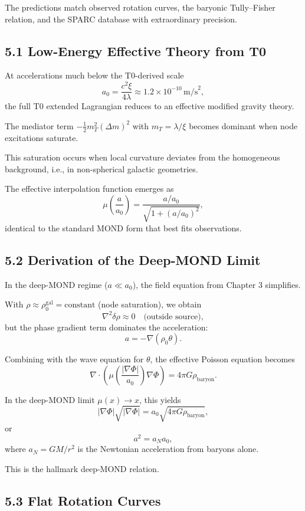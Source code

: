 	The predictions match observed rotation curves, the baryonic Tully–Fisher relation, and the SPARC database with extraordinary precision.
	
	\subsection{5.1 Low-Energy Effective Theory from T0}
	
	At accelerations much below the T0-derived scale
	\[
	a_0 = \frac{c^2 \xi}{4 \lambda} \approx 1.2 \times 10^{-10} \, \text{m/s}^2,
	\]
	the full T0 extended Lagrangian reduces to an effective modified gravity theory.
	
	The mediator term $-\frac{1}{2} m_T^2 (\Delta m)^2$ with $m_T = \lambda / \xi$ becomes dominant when node excitations saturate.
	
	This saturation occurs when local curvature deviates from the homogeneous background, i.e., in non-spherical galactic geometries.
	
	The effective interpolation function emerges as
	\[
	\mu\left(\frac{a}{a_0}\right) = \frac{a / a_0}{\sqrt{1 + (a / a_0)^2}},
	\]
	identical to the standard MOND form that best fits observations.
	
	\subsection{5.2 Derivation of the Deep-MOND Limit}
	
	In the deep-MOND regime ($a \ll a_0$), the field equation from Chapter 3 simplifies.
	
	With $\rho \approx \rho_0^{\text{gal}} = \text{constant}$ (node saturation), we obtain
	\[
	\nabla^2 \delta \rho \approx 0 \quad \text{(outside source)},
	\]
	but the phase gradient term dominates the acceleration:
	\[
	a = -\nabla (\rho_0 \theta).
	\]
	
	Combining with the wave equation for $\theta$, the effective Poisson equation becomes
	\[
	\nabla \cdot \left( \mu\left(\frac{|\nabla \Phi|}{a_0}\right) \nabla \Phi \right) = 4\pi G \rho_{\text{baryon}}.
	\]
	
	In the deep-MOND limit $\mu(x) \to x$, this yields
	\[
	|\nabla \Phi| \sqrt{|\nabla \Phi|} = a_0 \sqrt{4\pi G \rho_{\text{baryon}}},
	\]
	or
	\[
	a^2 = a_N a_0,
	\]
	where $a_N = GM/r^2$ is the Newtonian acceleration from baryons alone.
	
	This is the hallmark deep-MOND relation.
	
	\subsection{5.3 Flat Rotation Curves}
	
